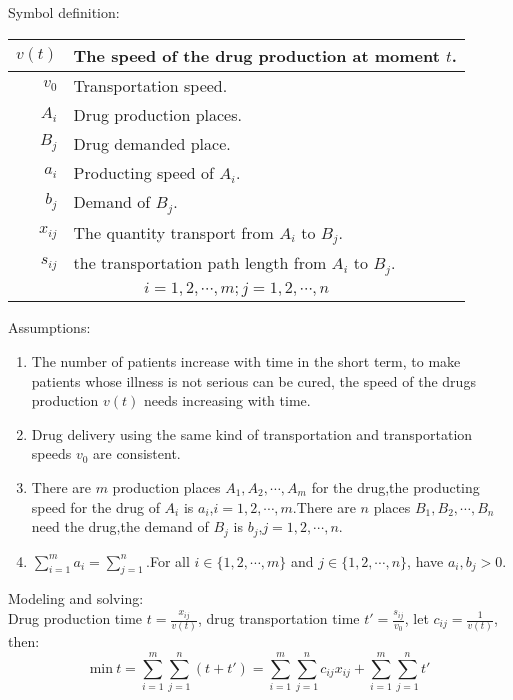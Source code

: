 Symbol definition:
\begin{center}
\begin{tabular}{|r|p{8cm}|}
\hline
$ v(t) $ & The speed of the drug production at moment $t$.\\
\hline
$ v_0 $ & Transportation speed.\\
\hline
$ A_i $ & Drug production places.\\
\hline
$ B_j $ & Drug demanded place.\\
\hline
$ a_i $ & Producting speed of $A_i$.\\
\hline
$ b_j $ & Demand of $ B_j $.\\
\hline
$ x_{ij} $ & The quantity transport from $ A_i $ to
$ B_j $.\\
\hline
$ s_{ij} $ & the transportation path length from $A_i$ to $B_j$.\\
\hline
\multicolumn{2}{|c|}{$ i=1,2,\cdots,m;j=1,2,\cdots,n $}\\
\hline
\end{tabular}
\end{center}%
Assumptions:
\begin{enumerate}
  \item The number of patients increase with time in the short
term, to make patients whose illness is not serious can be
cured, the speed of the drugs production $ v(t) $ needs
increasing with time.
  \item Drug delivery using the same kind of transportation and
transportation speeds $ v_0 $ are consistent.
  \item There are $ m $ production places $ A_1,A_2,\cdots,A_m $
for the drug,the producting speed for the drug of $ A_i $ is
$ a_i $,$ i=1,2,\cdots,m $.There are $ n $ places $
B_1,B_2,\cdots,B_n $ need the drug,the demand of $ B_j $ is
$ b_j $,$ j=1,2,\cdots,n $.
  \item $ \sum_{i=1}^{m}a_i=\sum_{j=1}^{n} $.For all
$ i\in\{1,2,\cdots,m\} $ and $ j\in\{1,2,\cdots,n\} $, have
$ a_i,b_j>0 $.
\end{enumerate}
Modeling and solving:\\
Drug production time $ t=\frac{x_{ij}}{v(t)} $, drug
transportation time $ t'=\frac{s_{ij}}{v_0} $, let
$ c_{ij}=\frac{1}{v(t)} $, then:\\
\begin{equation}
\mathrm{min}~t=\sum_{i=1}^{m}\sum_{j=1}^{n}(t+t')=
\sum_{i=1}^{m}\sum_{j=1}^{n}c_{ij}x_{ij} + 
\sum_{i=1}^{m}\sum_{j=1}^{n}t'
\label{equ:31}
\end{equation}
